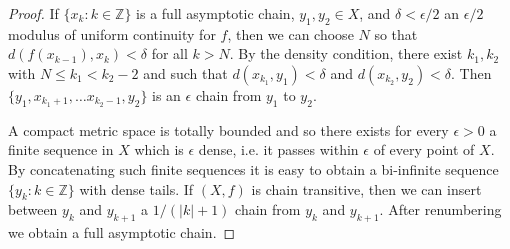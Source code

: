 \documentclass[10pt,a4paper]{amsart}
\def \Z {\mathbb Z}
\def \d {\delta}
\def \ep {\epsilon}
\begin{document}
\begin{proof} If $\{ x_k : k \in \Z \}$ is a full asymptotic chain, $y_1, y_2 \in X$, and $\d < \ep/2$ an $\ep/2$ modulus of uniform
continuity for $f$, then we can choose $N$ so that  $d(f(x_{k-1}),x_k) < \d$ for all $k > N$. By the density condition, there exist $k_1, k_2$ with
$N \le k_1  < k_2 - 2$ and such that $d(x_{k_1},y_1) < \d$ and $d(x_{k_2},y_2) < \d$. Then $\{ y_1, x_{k_1+1}, \dots x_{k_2 - 1}, y_2 \}$
is an $\ep$ chain from $y_1$ to $y_2$.

A compact metric space is totally bounded and so there exists for every $\ep > 0$ a finite sequence in $X$ which is $\ep$ dense,
i.e. it passes within $\ep$ of every point of $X$.
By concatenating such finite sequences it is easy to obtain a bi-infinite sequence $\{ y_k : k \in \Z \}$ with dense tails. If $(X,f)$ is chain
transitive, then we can insert between $y_{k}$ and $y_{k+1}$ a $1/(|k| + 1)$ chain from $y_{k}$ and $y_{k+1}$. After renumbering we obtain
a full asymptotic chain.

\end{proof}\vspace{1cm}
\end{document}
